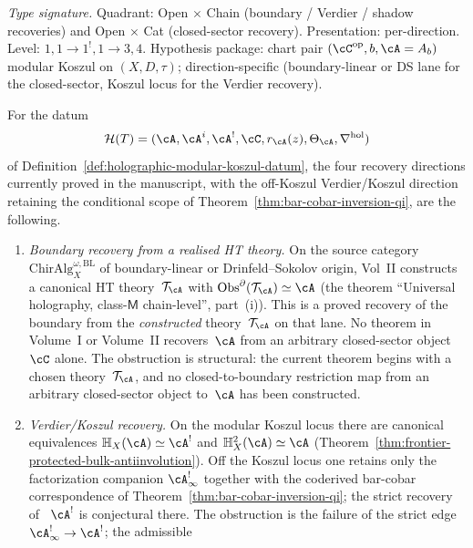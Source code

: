 \begin{proposition}
\label{prop:hdm-four-recovery-directions}
\emph{Type signature.} Quadrant: Open $\times$ Chain
(boundary / Verdier / shadow recoveries) and Open $\times$ Cat
(closed-sector recovery). Presentation: per-direction. Level:
$1, 1\!\to\!1^!, 1\!\to\!3, 4$. Hypothesis package: chart pair
$(\cC^{\mathrm{op}}, b, \cA = A_b)$ modular Koszul on $(X,D,\tau)$;
direction-specific (boundary-linear or DS lane for the closed-sector,
Koszul locus for the Verdier recovery).

For the datum
\[
\mathcal{H}(T)
=
(\cA,\cA^i,\cA^!,\cC,r_\cA(z),\Theta_\cA,\nabla^{\mathrm{hol}})
\]
of Definition~\ref{def:holographic-modular-koszul-datum}, the four
recovery directions currently proved in the manuscript, with the
off-Koszul Verdier/Koszul direction retaining the conditional scope of
Theorem~\textup{\ref{thm:bar-cobar-inversion-qi}}, are the following.
\begin{enumerate}[label=\textup{(\roman*)}]
\item \emph{Boundary recovery from a realised HT theory.}
 On the source category
 $\mathrm{ChirAlg}^{\omega,\mathrm{BL}}_X$
 of boundary-linear or Drinfeld--Sokolov origin, Vol~II constructs a
 canonical HT theory~$\mathcal T_\cA$ with
 $\mathrm{Obs}^{\partial}(\mathcal T_\cA)\simeq \cA$
 \textup{(}the theorem ``Universal holography, class-$\mathsf{M}$
 chain-level'', part~\textup{(i)}\textup{)}.
 This is a proved recovery of the boundary from the \emph{constructed}
 theory~$\mathcal T_\cA$ on that lane. No theorem in Volume~I or
 Volume~II recovers~$\cA$ from an arbitrary closed-sector object~$\cC$ alone.
 The obstruction is structural: the current theorem begins with a
 chosen theory~$\mathcal T_\cA$, and no closed-to-boundary restriction
 map from an arbitrary closed-sector object to~$\cA$ has been constructed.
\item \emph{Verdier/Koszul recovery.}
 On the modular Koszul locus there are canonical equivalences
 $\mathbb H_X(\cA)\simeq \cA^!$ and
 $\mathbb H_X^2(\cA)\simeq \cA$
 \textup{(}Theorem~\ref{thm:frontier-protected-bulk-antiinvolution}\textup{)}.
 Off the Koszul locus one retains only the factorization companion
 $\cA^{!}_\infty$ together with the coderived bar-cobar correspondence
 of Theorem~\ref{thm:bar-cobar-inversion-qi}; the strict recovery of
~$\cA^!$ is conjectural there. The obstruction is the failure of the
strict edge $\cA^{!}_\infty\to\cA^!$; the admissible

\end{enumerate}
\end{proposition}

